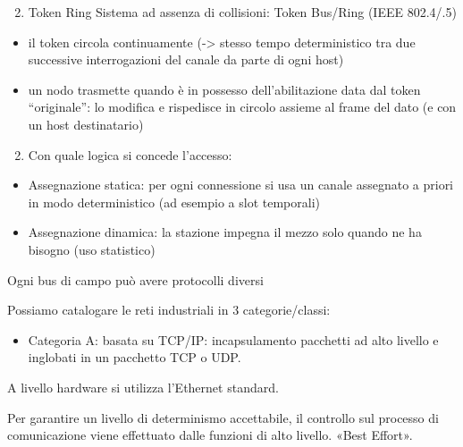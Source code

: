 \documentclass[
]{article}
\providecommand{\tightlist}{%
  \setlength{\itemsep}{0pt}\setlength{\parskip}{0pt}}
\begin{document}
\begin{enumerate}
\setcounter{enumi}{1}
\tightlist
\item
  {Token Ring Sistema ad assenza di collisioni: Token Bus/Ring (IEEE
  802.4/.5) }
\end{enumerate}

\begin{itemize}
\tightlist
\item
  {il token circola continuamente (-> stesso tempo deterministico tra due
  successive interrogazioni del canale da parte di ogni host) }
\item
  {un nodo trasmette quando è in possesso dell'abilitazione data dal
  token ``originale'': lo modifica e rispedisce in circolo assieme al
  frame del dato (e con un host destinatario) }
\end{itemize}

{}

\begin{enumerate}
\setcounter{enumi}{1}
\tightlist
\item
  {Con quale logica si concede l'accesso: }
\end{enumerate}

\begin{itemize}
\tightlist
\item
  {Assegnazione statica: per ogni connessione si usa un canale assegnato
  a priori in modo deterministico (ad esempio a slot temporali) }
\item
  {Assegnazione dinamica: la stazione impegna il mezzo solo quando ne ha
  bisogno (uso statistico) }
\end{itemize}

{}

{Ogni bus di campo può avere protocolli diversi}

{}

{}

{Possiamo catalogare le reti industriali in 3 categorie/classi:}

\begin{itemize}
\tightlist
\item
  {Categoria A: basata su TCP/IP: incapsulamento pacchetti ad alto
  livello e inglobati in un pacchetto TCP o UDP. }
\end{itemize}

{A livello hardware si utilizza l'Ethernet standard. }

{Per garantire un livello di determinismo accettabile, il controllo sul
processo di comunicazione viene effettuato dalle funzioni di alto
livello. «Best Effort». }
\end{document}
